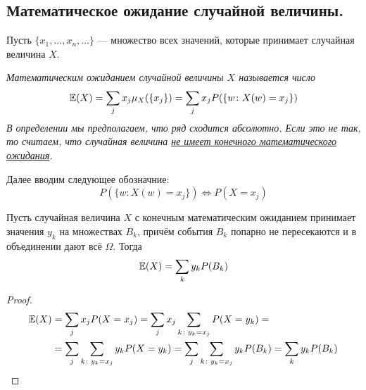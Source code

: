 \begin{comment}
    В последнем равенстве во втором равно явно использована абсолютная сходимость рядов
    \[
        \sum\limits_{i \colon x_i \in A} P(\{w \colon X(w) = x_i\})
        \text{ и}
        \sum\limits_{j \colon y_j \in B} P(\{w \colon Y(w) = y_j\})
    \]
    До второго равно написана операция произведения двух рядов, а после второго равно написано что в
    результате произведения случилось с каждым элементом ряда (по определению произведения
    абсолютно сходящихся рядов).
\end{comment}

\subsection{Математическое ожидание случайной величины.}
Пусть $\{x_1, \ldots, x_n, \ldots\}$ --- множество всех значений, которые принимает случайная величина $X$.
\begin{definition}
    \it{Математическим ожиданием} случайной величины $X$ называется число
    \[
        \mathbb{E}(X) = \sum\limits_{j}x_j\mu_X(\{x_j\}) =
        \sum\limits_{j}x_j P(\{w \colon X(w) = x_j\})
    \]
    В определении мы предполагаем, что ряд сходится абсолютно. Если это не так, то считаем, что
    случайная величина \underline{не имеет конечного математического ожидания}.
\end{definition}
\begin{designation}
    Далее вводим следующее обозначние:
    \[
        P(\{w \colon X(w) = x_j\}) \iff P(X = x_j)
    \]
\end{designation}
\begin{lemma}
    \label{lemma_2.1}
    Пусть случайная величина $X$ с конечным математическим ожиданием принимает значения $y_k$ на множествах
    $B_k$, причём события $B_k$ попарно не пересекаются и в объединении дают всё $\Omega$. Тогда
    \[
        \mathbb{E}(X) = \sum\limits_{k} y_k P(B_k)
    \]
\end{lemma}
\begin{proof}
    \begin{align*}
        \mathbb{E}(X) &= \sum\limits_{j}x_j P(X = x_j) =
        \sum\limits_{j} x_j \sum\limits_{k \colon y_k = x_j} P(X = y_k) =\\
        &=\sum\limits_{j} \sum\limits_{k \colon y_k = x_j}
        y_k P(X = y_k) = \sum\limits_{j} \sum\limits_{k \colon y_k = x_j}
        y_k P(B_k) = \sum\limits_{k}
        y_k P(B_k)
    \end{align*}
\end{proof}
\begin{comment}
    Заметим, что по условию у нас величина $X$ имеет конечное математическое ожидание, а значит
    ряд $\sum\limits_{j}x_j P(X = x_j)$ сходится абсолютно, а значит мы можем группировать отдельные
    его слагаемые, так как мы это делали в доказательстве.
\end{comment}

